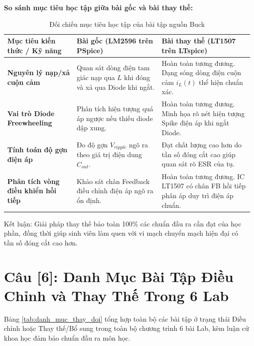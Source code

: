 \documentclass[12pt,a4paper]{report}
\begin{document}
\textbf{So sánh mục tiêu học tập giữa bài gốc và bài thay thế:}
\begin{table}[H]
\centering
\caption{Đối chiếu mục tiêu học tập của bài tập nguồn Buck}
\label{tab:so_sanh_buck}
\renewcommand{\arraystretch}{1.2}
\small
\begin{tabularx}{\textwidth}{|p{4.5cm}|X|X|}
\hline
\rowcolor{codebg}
\textbf{Mục tiêu kiến thức / Kỹ năng} & \textbf{Bài gốc (LM2596 trên PSpice)} & \textbf{Bài thay thế (LT1507 trên LTspice)} \\ \hline
\textbf{Nguyên lý nạp/xả cuộn cảm} & Quan sát dòng điện tam giác nạp qua $L$ khi đóng và xả qua Diode khi ngắt. & Hoàn toàn tương đương. Dạng sóng dòng điện cuộn cảm $i_L(t)$ thể hiện chuẩn xác. \\ \hline
\textbf{Vai trò Diode Freewheeling} & Phân tích hiện tượng quá áp ngược nếu thiếu diode dập xung. & Hoàn toàn tương đương. Minh họa rõ nét hiện tượng Spike điện áp khi ngắt Diode. \\ \hline
\textbf{Tính toán độ gợn điện áp} & Đo độ gợn $V_{ripple}$ ngõ ra theo giá trị điện dung $C_{out}$. & Đạt chất lượng cao hơn do tần số đóng cắt cao giúp quan sát rõ ESR của tụ. \\ \hline
\textbf{Phân tích vòng điều khiển hồi tiếp} & Khảo sát chân Feedback điều chỉnh điện áp ngõ ra ổn định. & Hoàn toàn tương đương. IC LT1507 có chân FB hồi tiếp phân áp duy trì điện áp chuẩn. \\ \hline
\end{tabularx}
\end{table}
Kết luận: Giải pháp thay thế bảo toàn 100\% các chuẩn đầu ra cần đạt của học phần, đồng thời giúp sinh viên làm quen với vi mạch chuyển mạch hiện đại có tần số đóng cắt cao hơn.

\section*{Câu [6]: Danh Mục Bài Tập Điều Chỉnh và Thay Thế Trong 6 Lab}

Bảng \ref{tab:danh_muc_thay_doi} tổng hợp toàn bộ các bài tập ở trạng thái Điều chỉnh hoặc Thay thế/Bổ sung trong toàn bộ chương trình 6 bài Lab, kèm luận cứ khoa học đảm bảo chuẩn đầu ra môn học.
\end{document}
